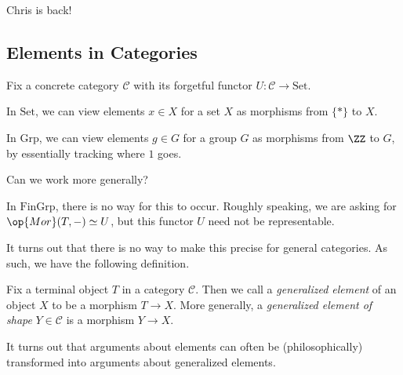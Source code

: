 \documentclass[../notes.tex]{subfiles}
\begin{document}

Chris is back!

\subsection{Elements in Categories}
Fix a concrete category $\mathcal C$ with its forgetful functor $U:\mathcal C\to\mathrm{Set}$.
\begin{example}
	In $\mathrm{Set}$, we can view elements $x\in X$ for a set $X$ as morphisms from $\{*\}$ to $X$.
\end{example}
\begin{example}
	In $\mathrm{Grp}$, we can view elements $g\in G$ for a group $G$ as morphisms from $\ZZ$ to $G$, by essentially tracking where $1$ goes.
\end{example}
Can we work more generally?
\begin{nex}
	In $\mathrm{FinGrp}$, there is no way for this to occur. Roughly speaking, we are asking for $\op{Mor}(T,-)\simeq U$, but this functor $U$ need not be representable.
\end{nex}
It turns out that there is no way to make this precise for general categories. As such, we have the following definition.
\begin{definition}
	Fix a terminal object $T$ in a category $\mathcal C$. Then we call a \textit{generalized element} of an object $X$ to be a morphism $T\to X$. More generally, a \textit{generalized element of shape} $Y\in\mathcal C$ is a morphism $Y\to X$.
\end{definition}
It turns out that arguments about elements can often be (philosophically) transformed into arguments about generalized elements.
\end{document}
